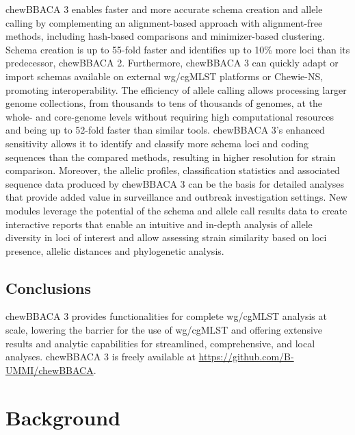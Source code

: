 chewBBACA 3 enables faster and more accurate schema creation and allele calling by complementing an alignment-based approach with alignment-free methods, including hash-based comparisons and minimizer-based clustering. Schema creation is up to 55-fold faster and identifies up to 10\% more loci than its predecessor, chewBBACA 2. Furthermore, chewBBACA 3 can quickly adapt or import schemas available on external wg/cgMLST platforms or Chewie-NS, promoting interoperability. The efficiency of allele calling allows processing larger genome collections, from thousands to tens of thousands of genomes, at the whole- and core-genome levels without requiring high computational resources and being up to 52-fold faster than similar tools. chewBBACA 3’s enhanced sensitivity allows it to identify and classify more schema loci and coding sequences than the compared methods, resulting in higher resolution for strain comparison. Moreover, the allelic profiles, classification statistics and associated sequence data produced by chewBBACA 3 can be the basis for detailed analyses that provide added value in surveillance and outbreak investigation settings. New modules leverage the potential of the schema and allele call results data to create interactive reports that enable an intuitive and in-depth analysis of allele diversity in loci of interest and allow assessing strain similarity based on loci presence, allelic distances and phylogenetic analysis.

\subsection{Conclusions} \label{ssec:ch2_abstract}

chewBBACA 3 provides functionalities for complete wg/cgMLST analysis at scale, lowering the barrier for the use of wg/cgMLST and offering extensive results and analytic capabilities for streamlined, comprehensive, and local analyses. chewBBACA 3 is freely available at \url{https://github.com/B-UMMI/chewBBACA}.

\section{Background} \label{sec:ch2_background}

